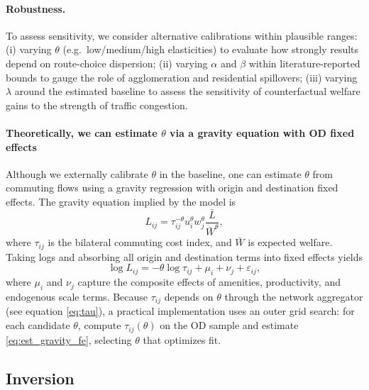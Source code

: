 \documentclass[12pt]{article}
\begin{document}
	\paragraph{Robustness.} To assess sensitivity, we consider alternative calibrations within plausible ranges: (i) varying $\theta$ (e.g.\ low/medium/high elasticities) to evaluate how strongly results depend on route-choice dispersion; (ii) varying $\alpha$ and $\beta$ within literature-reported bounds to gauge the role of agglomeration and residential spillovers; (iii) varying $\lambda$ around the estimated baseline to assess the sensitivity of counterfactual welfare gains to the strength of traffic congestion.
	
	\paragraph{Theoretically, we can estimate $\theta$ via a gravity equation with OD fixed effects}
	Although we externally calibrate $\theta$ in the baseline, one can estimate $\theta$ from commuting flows using a gravity regression with origin and destination fixed effects. The gravity equation implied by the model is
	\begin{equation}\label{eq:est_gravity}
		L_{ij}=\tau_{ij}^{-\theta}u_i^\theta w_j^\theta\frac{\bar L}{\bar W^\theta},
	\end{equation}
	where $\tau_{ij}$ is the bilateral commuting cost index, and $\bar W$ is expected welfare. Taking logs and absorbing all origin and destination terms into fixed effects yields
	\begin{equation}\label{eq:est_gravity_fe}
		\log L_{ij}=-\theta \log \tau_{ij}+\mu_i+\nu_j+\varepsilon_{ij},
	\end{equation}
	where $\mu_i$ and $\nu_j$ capture the composite effects of amenities, productivity, and endogenous scale terms. Because $\tau_{ij}$ depends on $\theta$ through the network aggregator (see equation \eqref{eq:tau}), a practical implementation uses an outer grid search: for each candidate $\theta$, compute $\tau_{ij}(\theta)$ on the OD sample and estimate \eqref{eq:est_gravity_fe}, selecting $\theta$ that optimizes fit.
	
	\subsection{Inversion}
	
\end{document}
